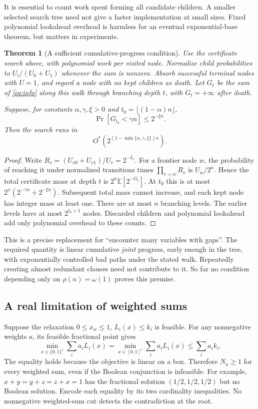 \documentclass[11pt,a4paper]{article}
\newtheorem{theorem}[proposition]{Theorem}
\theoremstyle{remark}
\newcommand{\Ostar}{O^{*}}
\newcommand{\E}{\mathbb E}
\begin{document}
It is essential to count work spent forming all candidate children. A
smaller selected search tree need not give a faster implementation at small
sizes. Fixed polynomial lookahead overhead is harmless for an eventual
exponential-base theorem, but matters in experiments.

\begin{theorem}[A sufficient cumulative-progress condition]
Use the certificate search above, with polynomial work per visited node.
Normalize child probabilities to $U_i/(U_0+U_1)$ whenever the sum is nonzero.
Absorb successful terminal nodes with $U=1$, and regard a node with no kept
children as death. Let $G_t$ be the sum of \eqref{eq:info} along this walk
through branching depth $t$, with $G_t=+\infty$ after death.

Suppose, for constants $\alpha,\gamma,\xi>0$ and
$t_0=\lfloor(1-\alpha)n\rfloor$,
\[
 \Pr[G_{t_0}<\gamma n]\le2^{-\xi n}.
\]
Then the search runs in
\[
 \Ostar\!\left(2^{(1-\min\{\alpha,\gamma,\xi\})n}\right).
\]
\end{theorem}
\begin{proof}
Write $R_v=(U_{v0}+U_{v1})/U_v=2^{-I_v}$. For a frontier node $w$, the
probability of reaching it under normalized transitions times
$\prod_{v\prec w}R_v$ is $U_w/2^n$. Hence the total certificate mass at
depth $t$ is $2^n\E[2^{-G_t}]$.
At $t_0$ this is at most
$2^n(2^{-\gamma n}+2^{-\xi n})$.
Subsequent total mass cannot increase, and each kept node has integer mass
at least one. There are at most $n$ branching levels. The earlier levels
have at most $2^{t_0+1}$ nodes. Discarded children and polynomial lookahead
add only polynomial overhead to these counts.
\end{proof}

This is a precise replacement for ``encounter many variables with gaps''.
The required quantity is linear cumulative \emph{joint} progress, early
enough in the tree, with exponentially controlled bad paths under the stated
walk. Repeatedly creating almost redundant clauses need not contribute to it.
So far no condition depending only on $\rho(n)=\omega(1)$ proves this premise.

\subsection{A real limitation of weighted sums}

Suppose the relaxation $0\le x_w\le1$, $L_i(x)\le k_i$ is feasible.
For any nonnegative weights $a$, its feasible fractional point gives
\[
 \min_{x\in\{0,1\}^r}\sum_i a_i L_i(x)
 =\min_{x\in[0,1]^r}\sum_i a_i L_i(x)
 \le\sum_i a_i k_i.
\]
The equality holds because the objective is linear on a box. Therefore
$N_a\ge1$ for every weighted sum, even if the Boolean conjunction is
infeasible. For example, $x+y=y+z=z+x=1$ has the fractional solution
$(1/2,1/2,1/2)$ but no Boolean solution. Encode each equality by its two
cardinality inequalities. No nonnegative weighted-sum cut detects the
contradiction at the root.
\end{document}
